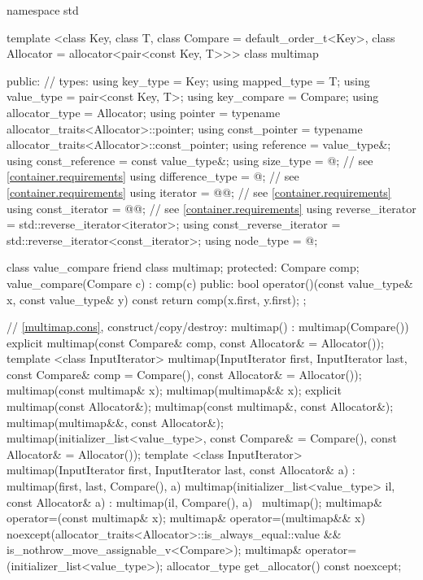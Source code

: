 \begin{codeblock}
namespace std {
  template <class Key, class T, class Compare = default_order_t<Key>,
            class Allocator = allocator<pair<const Key, T>>>
  class multimap {
  public:
    // types:
    using key_type               = Key;
    using mapped_type            = T;
    using value_type             = pair<const Key, T>;
    using key_compare            = Compare;
    using allocator_type         = Allocator;
    using pointer                = typename allocator_traits<Allocator>::pointer;
    using const_pointer          = typename allocator_traits<Allocator>::const_pointer;
    using reference              = value_type&;
    using const_reference        = const value_type&;
    using size_type              = @\impdef@; // see \ref{container.requirements}
    using difference_type        = @\impdef@; // see \ref{container.requirements}
    using iterator               = @@; // see \ref{container.requirements}
    using const_iterator         = @@; // see \ref{container.requirements}
    using reverse_iterator       = std::reverse_iterator<iterator>;
    using const_reverse_iterator = std::reverse_iterator<const_iterator>;
    using node_type              = @\unspec@;

    class value_compare {
      friend class multimap;
    protected:
      Compare comp;
      value_compare(Compare c) : comp(c) { }
    public:
      bool operator()(const value_type& x, const value_type& y) const {
        return comp(x.first, y.first);
      }
    };

    // \ref{multimap.cons}, construct/copy/destroy:
    multimap() : multimap(Compare()) { }
    explicit multimap(const Compare& comp, const Allocator& = Allocator());
    template <class InputIterator>
      multimap(InputIterator first, InputIterator last,
               const Compare& comp = Compare(),
               const Allocator& = Allocator());
    multimap(const multimap& x);
    multimap(multimap&& x);
    explicit multimap(const Allocator&);
    multimap(const multimap&, const Allocator&);
    multimap(multimap&&, const Allocator&);
    multimap(initializer_list<value_type>,
      const Compare& = Compare(),
      const Allocator& = Allocator());
    template <class InputIterator>
      multimap(InputIterator first, InputIterator last, const Allocator& a)
        : multimap(first, last, Compare(), a) { }
    multimap(initializer_list<value_type> il, const Allocator& a)
      : multimap(il, Compare(), a) { }
    ~multimap();
    multimap& operator=(const multimap& x);
    multimap& operator=(multimap&& x)
      noexcept(allocator_traits<Allocator>::is_always_equal::value &&
               is_nothrow_move_assignable_v<Compare>);
    multimap& operator=(initializer_list<value_type>);
    allocator_type get_allocator() const noexcept;

}}
\end{codeblock}
